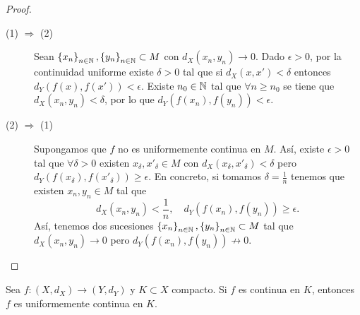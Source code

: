 \begin{proof}
\begin{description}
	\item[(1) $\displaystyle \Rightarrow $ (2)] Sean $\displaystyle \left\{ x_{n}\right\} _{n\in\mathbb{N}}, \left\{ y_{n}\right\} _{n\in\mathbb{N}} \subset M $ con $\displaystyle d _{X}\left(x_{n}, y_{n}\right) \to 0 $. Dado $\displaystyle \epsilon > 0 $, por la continuidad uniforme existe $\displaystyle \delta > 0 $ tal que si $\displaystyle d _{X}\left(x,x'\right) < \delta  $ entonces $\displaystyle d _{Y}\left(f\left(x\right), f\left(x'\right)\right) < \epsilon  $. Existe $\displaystyle n_{0} \in \mathbb{N} $ tal que $\displaystyle \forall n \geq n_{0} $ se tiene que $\displaystyle d _{X}\left(x_{n}, y_{n}\right) < \delta  $, por lo que $\displaystyle d _{Y}\left(f\left(x_{n}\right), f\left(y_{n}\right)\right) < \epsilon  $. 
	\item[(2) $\displaystyle \Rightarrow $ (1)] Supongamos que $\displaystyle f $ no es uniformemente continua en $\displaystyle M $. Así, existe $\displaystyle \epsilon > 0 $ tal que $\displaystyle \forall \delta > 0 $ existen $\displaystyle x_{\delta }, x'_{\delta } \in M $ con $\displaystyle d _{X}\left(x_{\delta }, x'_{\delta }\right) < \delta  $ pero $\displaystyle d _{Y}\left(f\left(x_{\delta }\right), f\left(x'_{\delta }\right)\right) \geq \epsilon $. En concreto, si tomamos $\displaystyle \delta = \frac{1}{n} $ tenemos que existen $\displaystyle x_{n}, y_{n} \in M $ tal que 
		\[ d _{X}\left(x_{n}, y_{n}\right) < \frac{1}{n}, \quad d _{Y}\left(f\left(x_{n}\right), f\left(y_{n}\right)\right) \geq \epsilon  .\]
		Así, tenemos dos sucesiones $\displaystyle \left\{ x_{n}\right\} _{n\in\mathbb{N}}, \left\{ y_{n}\right\} _{n\in\mathbb{N}} \subset M $ tal que $\displaystyle d _{X}\left(x_{n}, y_{n}\right) \to 0 $ pero $\displaystyle d _{Y}\left(f\left(x_{n}\right), f\left(y_{n}\right)\right) \not \to 0 $.
\end{description}
\end{proof}
\begin{theorem}
Sea $\displaystyle f : \left(X, d _{X}\right) \to \left(Y, d _{Y}\right) $ y $\displaystyle K \subset X $ compacto. Si $\displaystyle f $ es continua en $\displaystyle K $, entonces $\displaystyle f $ es uniformemente continua en $\displaystyle K $.
\end{theorem}
